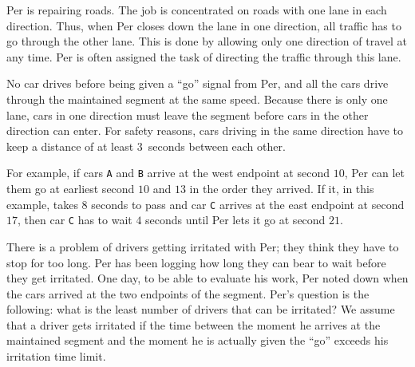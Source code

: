 

Per is repairing roads. The job is concentrated on roads with one lane in each direction.
Thus, when Per closes down the lane in one direction, all traffic has to go through the other lane.
This is done by allowing only one direction of travel at any time.
Per is often assigned the task of directing the traffic through this lane.

No car drives before being given a ``go'' signal from Per, and all the cars drive through the maintained segment at the same speed.
Because there is only one lane, cars in one direction must leave the segment before cars in the other direction can enter.
For safety reasons, cars driving in the same direction have to keep a distance of at least $3$~seconds between each other.

For example, if cars \verb!A! and \verb!B! arrive at the west endpoint at second $10$, Per can let them go at earliest second $10$ and $13$ in the order they arrived.
If it, in this example, takes $8$ seconds to pass and car \verb!C! arrives at the east endpoint at second $17$, then car \verb!C! has to wait $4$ seconds until Per lets it go at second $21$.

There is a problem of drivers getting irritated with Per; they think they have to stop for too long. Per has been logging how long they can bear to wait before they get irritated.
One day, to be able to evaluate his work, Per noted down when the cars arrived at the two endpoints of the segment. Per's question is the following: what is the least number of drivers that can be irritated? We assume that a driver gets irritated if the time between the moment he arrives at the maintained segment and the moment he is actually given the ``go'' exceeds his irritation time limit.

